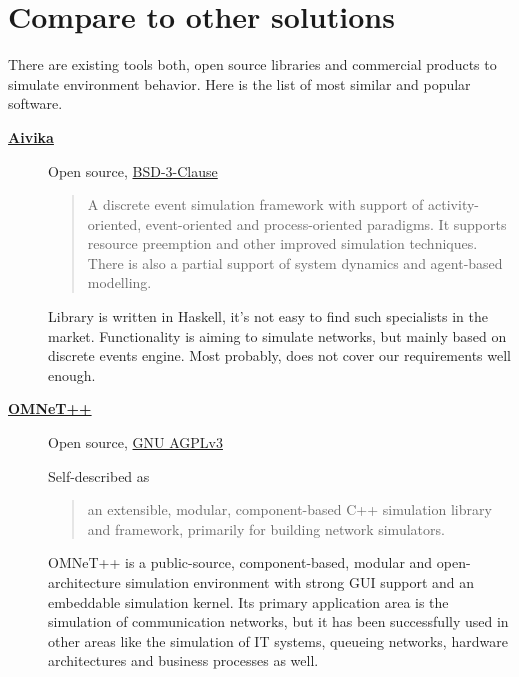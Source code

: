 \documentclass[12pt,oneside]{article}
\begin{document}
                      \section{Compare to other solutions}

                      There are existing tools both, open source libraries and commercial products to simulate environment behavior. Here is the list of most similar and popular software.\par
                      \begin{description}
                        \item[\href{https://github.com/dsorokin/aivika}{\textbf{Aivika}}]
                      Open source, \href{https://hackage.haskell.org/package/aivika-5.9/src/LICENSE}{BSD-3-Clause}
                          \begin{quote}
                      A discrete event simulation framework with support of activity-oriented, event-oriented and process-oriented paradigms. It supports resource preemption and other improved simulation techniques. There is also a partial support of system dynamics and agent-based modelling.
                          \end{quote}
                      Library is written in Haskell, it's not easy to find such specialists in the market. Functionality is aiming to simulate networks, but mainly based on discrete events engine. Most probably, does not cover our requirements well enough.

                        \item[\href{https://omnetpp.org/}{\textbf{OMNeT++}}]
                      Open source, \href{https://github.com/omnetpp/omnetpp}{GNU AGPLv3}\par
                      Self-described as
                          \begin{quote}
                              an extensible, modular, component-based C++ simulation library and framework, primarily for building network simulators.
                          \end{quote}
                      OMNeT++ is a public-source, component-based, modular and open-architecture simulation environment with strong GUI support and an embeddable simulation kernel. Its primary application area is the simulation of communication networks, but it has been successfully used in other areas like the simulation of IT systems, queueing networks, hardware architectures and business processes as well.


\end{description}
\end{document}
